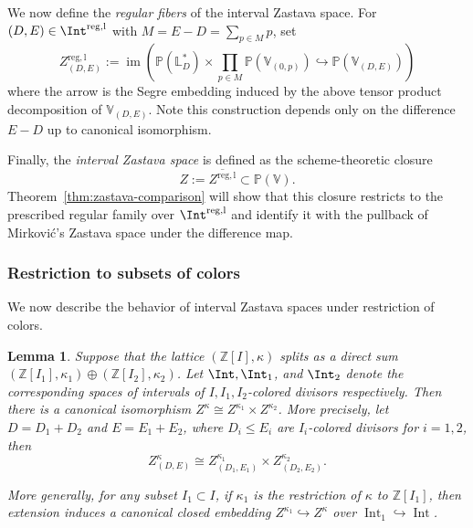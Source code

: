 \documentclass{amsart}
\numberwithin{equation}{section}
\numberwithin{figure}{section}
\newtheorem{lem}[thm]{Lemma}
\theoremstyle{definition}
\theoremstyle{remark}
\renewcommand{\b}[1]{\mathbb{#1}}
\begin{document}
We now define the \emph{regular fibers} of the interval Zastava space.  
For $(D,E)\in\Int^{\mathrm{reg,l}}$ with $M=E-D=\sum_{p\in M}p$, set
\[
Z^{\mathrm{reg,l}}_{(D,E)}
:= \operatorname{im}\left(
\b P(\b L_D^*)\times \prod_{p\in M}\b P(\b V_{(0,p)})\hookrightarrow\b P(\b V_{(D,E)}) \right)\]
where the arrow is the Segre embedding induced by the above tensor product
decomposition of $\b V_{(D,E)}$. Note this construction depends only on the difference $E-D$ up to canonical isomorphism.


Finally, the \emph{interval Zastava space} is defined as the
scheme-theoretic closure
\[
Z:=\overline{Z^{\mathrm{reg,l}}}
\subset\mathbb P(\mathbb V).
\]
Theorem~\ref{thm:zastava-comparison} will show that this closure
restricts to the prescribed regular family over
$\Int^{\mathrm{reg,l}}$ and identify it with the pullback of
Mirkovi\'c's Zastava space under the difference map.

\subsubsection{Restriction to subsets of colors}
We now describe the behavior of interval Zastava spaces under
restriction of colors.
\begin{lem} \label{lem:based-product-decomposition}
	Suppose that the lattice $(\mathbb Z[I],\kappa)$ splits as a direct sum
	$(\mathbb Z[I_1],\kappa_1)\oplus(\mathbb Z[I_2],\kappa_2)$.
	Let $\Int,\Int_1$, and $\Int_2$ denote the corresponding spaces of intervals of $I, I_1, I_2$-colored divisors respectively.
	Then there is a canonical isomorphism
	$Z^\kappa\cong Z^{\kappa_1}\times Z^{\kappa_2}$.
	More precisely, let $D=D_1+D_2$ and $E=E_1+E_2$, where
	$D_i\leq E_i$ are $I_i$-colored divisors for $i=1,2$, then 
	\[
	Z^\kappa_{(D,E)}
	\cong
	Z^{\kappa_1}_{(D_1,E_1)}
	\times
	Z^{\kappa_2}_{(D_2,E_2)}.
	\]
	
	More generally, for any subset $I_1\subset I$, if $\kappa_1$ is the restriction of \(\kappa\) to \(\mathbb Z[I_1]\), then extension induces a canonical closed embedding \(Z^{\kappa_1}\hookrightarrow Z^\kappa\) over  \(\operatorname{Int}_1\hookrightarrow\operatorname{Int}\).
\end{lem}
\end{document}
